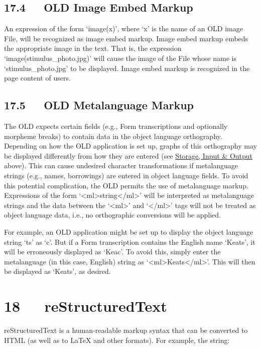 \documentclass[letterpaper,10pt,english]{sphinxmanual}
\begin{document}
\section{17.4   OLD Image Embed Markup}
\label{user_guide:old-image-embed-markup}
An expression of the form `image(x)', where `x' is the name of an OLD image
File, will be recognized as image embed markup.  Image embed markup embeds the
appropriate image in the text.  That is, the expression
`image(stimulus\_photo.jpg)' will cause the image of the File whose name is
`stimulus\_photo.jpg' to be displayed.  Image embed markup is recognized in the
page content of users.


\section{17.5   OLD Metalanguage Markup}
\label{user_guide:old-metalanguage-markup}
The OLD expects certain fields (e.g., Form transcriptions and optionally
morpheme breaks) to contain data in the object language orthography.  Depending
on how the OLD application is set up, graphs of this orthography may be
displayed differently from how they are entered (see {\hyperref[user_guide:storage-input-output]{Storage, Input \& Output}}
above).  This can cause undesired character transformations if metalanguage
strings (e.g., names, borrowings) are entered in object language fields.  To
avoid this potential complication, the OLD permits the use of metalanguage
markup.  Expressions of the form `\textless{}ml\textgreater{}string\textless{}/ml\textgreater{}' will be interpreted as
metalanguage strings and the data between the `\textless{}ml\textgreater{}' and `\textless{}/ml\textgreater{}' tags will not
be treated as object language data, i.e., no orthographic conversions will be
applied.

For example, an OLD application might be set up to display the object language
string `ts' as `c'.  But if a Form transcription contains the English name
`Keats', it will be erroneously displayed as `Keac'.  To avoid this, simply
enter the metalanguage (in this case, English) string as `\textless{}ml\textgreater{}Keats\textless{}/ml\textgreater{}'.  This
will then be displayed as `Keats', as desired.


\chapter{18   reStructuredText}
\label{user_guide:restructuredtext}
reStructuredText is a human-readable markup syntax that can be converted to
HTML (as well as to LaTeX and other formats).  For example, the string:
\begin{quote}


\code{================}
\end{quote}
\end{document}

